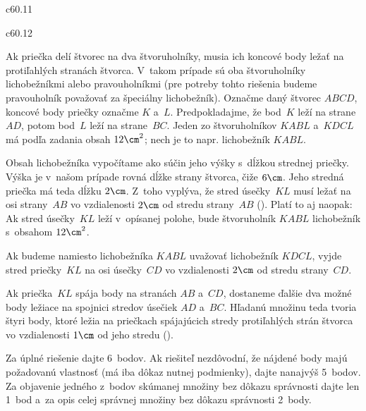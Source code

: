 {%
\epsplace c60.11 \hfil\Obr\par
\epsplace c60.12 \hfil\Obr\par
Ak priečka delí štvorec na dva štvoruholníky, musia ich koncové body
ležať na protiľahlých stranách štvorca. V~takom prípade sú oba
štvoruholníky lichobežníkmi alebo pravouholníkmi
(pre potreby tohto riešenia budeme pravouholník považovať
za špeciálny lichobežník). Označme daný štvorec $ABCD$, koncové body
priečky označme $K$ a~$L$. Predpokladajme, že bod~$K$ leží na strane~$AD$,
potom bod~$L$ leží na strane~$BC$. Jeden zo štvoruholníkov $KABL$ a~$KDCL$ má podľa
zadania obsah $12\cm^2$; nech je to napr. lichobežník $KABL$.

Obsah lichobežníka vypočítame ako súčin jeho výšky s~dĺžkou strednej
priečky. Výška je v~našom prípade rovná dĺžke strany štvorca, čiže
$6\cm$. Jeho stredná priečka má teda dĺžku $2\cm$. Z~toho vyplýva, že stred úsečky~$KL$
musí ležať na osi strany~$AB$ vo vzdialenosti $2\cm$ od stredu strany~$AB$ (\obr).
Platí to aj naopak: Ak stred úsečky~$KL$ leží v~opísanej polohe,
bude štvoruholník $KABL$ lichobežník s~obsahom $12\cm^2$.
\twocpictures

Ak budeme namiesto lichobežníka $KABL$ uvažovať lichobežník $KDCL$,
vyjde stred priečky~$KL$ na osi úsečky~$CD$ vo vzdialenosti $2\cm$
od stredu strany~$CD$.

Ak priečka~$KL$ spája body na stranách $AB$ a~$CD$, dostaneme
ďalšie dva možné body ležiace na spojnici stredov úsečiek $AD$ a~$BC$.
Hľadanú množinu teda tvoria štyri body, ktoré ležia na priečkach spájajúcich
stredy protiľahlých strán štvorca vo vzdialenosti $1\cm$ od jeho stredu (\obr).

\nobreak\medskip\petit\noindent
Za úplné riešenie dajte 6~bodov. Ak riešiteľ nezdôvodní, že nájdené body
majú požadovanú vlastnosť (má iba dôkaz nutnej podmienky), dajte
nanajvýš 5~bodov. Za objavenie jedného z~bodov skúmanej množiny bez dôkazu
správnosti dajte len 1~bod a~za opis celej správnej množiny bez dôkazu správnosti 2~body.
\endpetit
\bigbreak
}


